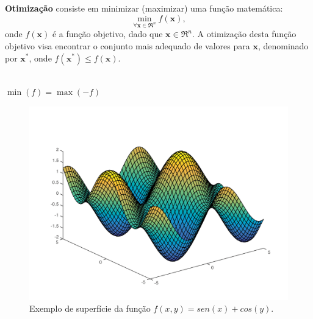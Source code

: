\begin{frame}
	\textbf{Otimização} consiste em minimizar (maximizar) uma função matemática:
	\begin{equation}
		\label{e.min_opt}
		\min_{\forall \mathbf{x} \in {\Re^n}} f(\mathbf{x}),
	\end{equation}
	onde $f(\mathbf{x})$ é a função objetivo, dado que $\mathbf{x} \in \Re^n$. A otimização desta função objetivo visa encontrar o conjunto mais adequado de valores para $\mathbf{x}$, denominado por $\mathbf{x}^*$, onde $f(\mathbf{x}^*) \leq f(\mathbf{x})$.
	\\~\\
	\begin{block}{}
		\centering
			$\min(f) = \max(-f)$
	\end{block}	
\end{frame}

\begin{frame}
	\begin{figure}
		\centering
		\includegraphics[scale=0.45]{figs/opt_function.png}	
		\caption{Exemplo de superfície da função $f(x,y)=sen(x)+cos(y)$.}
		\label{f.opt_function}
	\end{figure}
\end{frame}

